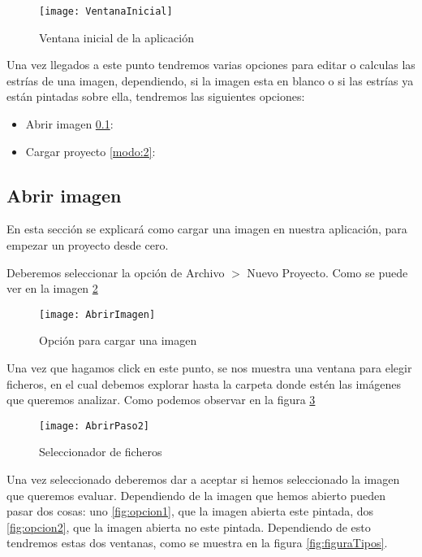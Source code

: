 \begin{figure}[h]
\centering
\texttt{[image: VentanaInicial]}
\caption{Ventana inicial de la aplicación}
\label{fig:E.1}
\end{figure}
Una vez llegados a este punto tendremos varias opciones para editar o calculas las estrías de una imagen, dependiendo, si la imagen esta en blanco o si las estrías ya están pintadas sobre ella, tendremos las siguientes opciones:

\begin{itemize}
	\item Abrir imagen \ref{modo:1}:
	\item Cargar proyecto \ref{modo:2}:
\end{itemize}

\subsection{Abrir imagen}
\label{modo:1}

En esta sección se explicará como cargar una imagen en nuestra aplicación, para empezar un proyecto desde cero.

Deberemos seleccionar la opción de Archivo  $>$ Nuevo Proyecto. Como se puede ver en la imagen \ref{fig:abrirPro}

\begin{figure}[h]
\centering
\texttt{[image: AbrirImagen]}
\caption{Opción para cargar una imagen}
\label{fig:abrirPro}
\end{figure}

Una vez que hagamos click en este punto, se nos muestra una ventana para elegir ficheros, en el cual debemos explorar hasta la carpeta donde estén las imágenes que queremos analizar. Como podemos observar en la figura \ref{fig:abrirPaso2}

\begin{figure}[h]
\centering
\texttt{[image: AbrirPaso2]}
\caption{Seleccionador de ficheros}
\label{fig:abrirPaso2}
\end{figure}

Una vez seleccionado deberemos dar a aceptar si hemos seleccionado la imagen que queremos evaluar.
Dependiendo de la imagen que hemos abierto pueden pasar dos cosas: uno \ref{fig:opcion1}, que la imagen abierta este pintada, dos \ref{fig:opcion2}, que la imagen abierta no este pintada. Dependiendo de esto tendremos estas dos ventanas, como se muestra en la figura \ref{fig:figuraTipos}.


